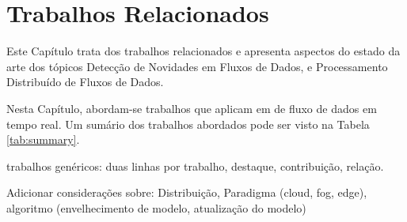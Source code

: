 \chapter{Trabalhos Relacionados}\label{cha:related}




Este Capítulo trata dos trabalhos relacionados e apresenta aspectos do estado da arte
dos tópicos Detecção de Novidades em Fluxos de Dados, e
Processamento Distribuído de Fluxos de Dados.


Nesta Capítulo, abordam-se trabalhos que aplicam  em  de fluxo de dados em tempo
real.
Um sumário dos trabalhos abordados pode ser visto na Tabela \ref{tab:summary}.

\newcommand{\kafka}{\emph{Apache Kafka}\xspace}
\newcommand{\spark}{\emph{Apache Spark}\xspace}
\newcommand{\python}{\emph{Python}\xspace}


trabalhos genéricos: duas linhas por trabalho, destaque, contribuição, relação.


Adicionar considerações sobre: Distribuição, Paradigma (cloud, fog, edge),
algoritmo (envelhecimento de modelo, atualização do modelo)


